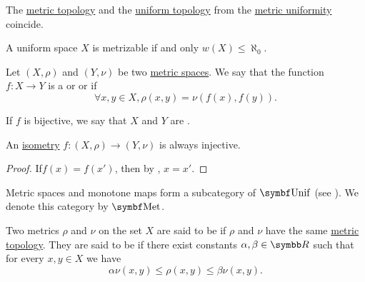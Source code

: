 \begin{Proposition}\label{thm:metric_topology_coincides_with_uniform_topology}
  The \hyperref[def:metric_topology]{metric topology} and the \hyperref[def:uniform_topology]{uniform topology} from the \hyperref[def:metric_uniformity]{metric uniformity} coincide.
\end{Proposition}

\begin{Theorem}\label{thm:countable_uniform_base_implies_metrizable}\cite[theorem 8.1.21]{Engelking1989}
  A uniform space \( X \) is metrizable if and only \( w(X) \leq \aleph_0 \).
\end{Theorem}

\begin{Definition}\label{def:isometry}\cite[253]{Engelking1989}
  Let \( (X, \rho) \) and \( (Y, \nu) \) be two \hyperref[def:metric_space]{metric spaces}. We say that the function \( f: X \to Y \) is a  or  or  if
  \begin{equation*}
    \forall x, y \in X, \rho(x, y) = \nu(f(x), f(y)).
  \end{equation*}

  If \( f \) is bijective, we say that \( X \) and \( Y \) are .
\end{Definition}

\begin{Proposition}\label{def:isometry_is_injective}
  An \hyperref[def:isometry]{isometry} \( f: (X, \rho) \to (Y, \nu) \) is always injective.
\end{Proposition}
\begin{proof}
  If\LEM \( f(x) = f(x') \), then by , \( x = x' \).
\end{proof}

\begin{Definition}\label{def:category_of_metric_spaces}
  Metric spaces and monotone maps form a subcategory of \( \Cat{Unif} \) (see ). We denote this category by \( \Cat{Met} \).
\end{Definition}

\begin{Definition}\label{def:equivalent_metrics}
  Two metrics \( \rho \) and \( \nu \) on the set \( X \) are said to be  if \( \rho \) and \( \nu \) have the same \hyperref[def:metric_topology]{metric topology}. They are said to be  if there exist constants \( \alpha, \beta \in \BR \) such that for every \( x, y \in X \) we have
  \begin{equation*}
    \alpha \nu(x, y) \leq \rho(x, y) \leq \beta \nu(x, y).
  \end{equation*}
\end{Definition}

